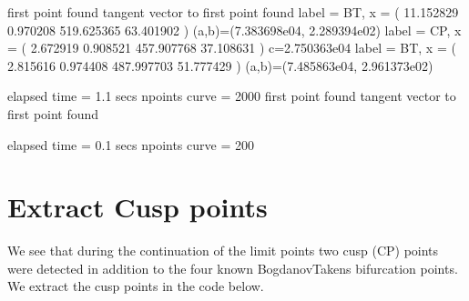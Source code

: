 \documentclass[letterpaper,10pt,english]{jupyterBook}
\begin{document}
\begin{sphinxVerbatim}[commandchars=\\\{\}]
\PYG{p}{[}\PYG{p}{]}
\PYG{p}{[}\PYG{p}{]}
\end{sphinxVerbatim}

\begin{sphinxVerbatim}[commandchars=\\\{\}]
first point found
tangent vector to first point found
label = BT, x = ( \PYGZhy{}11.152829 0.970208 519.625365 \PYGZhy{}63.401902 )
(a,b)=(7.383698e\PYGZhy{}04, 2.289394e\PYGZhy{}02)
label = CP, x = ( \PYGZhy{}2.672919 0.908521 457.907768 \PYGZhy{}37.108631 )
c=2.750363e\PYGZhy{}04
label = BT, x = ( 2.815616 0.974408 487.997703 \PYGZhy{}51.777429 )
(a,b)=(\PYGZhy{}7.485863e\PYGZhy{}04, \PYGZhy{}2.961373e\PYGZhy{}02)

elapsed time  = 1.1 secs
npoints curve = 2000
first point found
tangent vector to first point found

elapsed time  = 0.1 secs
npoints curve = 200
\end{sphinxVerbatim}


\section{Extract Cusp points}
\label{\detokenize{Morris-Lecar:extract-cusp-points}}
\sphinxAtStartPar
We see that during the continuation of the limit points two cusp (CP) points
were detected in addition to the four known Bogdanov\sphinxhyphen{}Takens bifurcation points.
We extract the cusp points in the code below.
\end{document}

